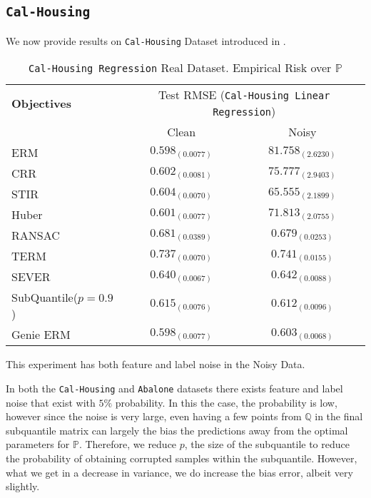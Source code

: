 \documentclass{article} %
\newcommand{\subhead}[1]{\multicolumn{1}{c}{#1}}%
\begin{document}
\begin{appendices}
	\subsection{\texttt{Cal-Housing}}
	We now provide results on \texttt{Cal-Housing} Dataset introduced in \cite{Kelley1997}.
	\begin{table}[!h]
		\centering
		\begin{tabular}{lcc}
			\toprule 
			\textbf{Objectives}&\multicolumn{2}{c}{Test RMSE (\texttt{Cal-Housing Linear Regression})}\\                   
			\cmidrule(rl){2-3}
			&\subhead{Clean}& \subhead{Noisy}\\ 
			\midrule
			ERM  &$0.598_{(0.0077)}$&$81.758_{(2.6230)}$\\
			CRR \cite{bhatia2017}  &$\mathbf{0.602_{(0.0081)}}$&$75.777_{(2.9403)}$\\
			STIR \cite{pmlr-v89-mukhoty19a}  &$\mathbf{0.604_{(0.0070)}}$&$65.555_{(2.1899)}$\\
			Huber \cite{Huber2009} &$\mathbf{0.601_{(0.0077)}}$&$71.813_{(2.0755)}$\\
			RANSAC \cite{RANSAC1981} &$0.681_{(0.0389)}$&$0.679_{(0.0253)}$\\
			TERM \cite{li2020tilted} &$0.737_{(0.0070)}$&$0.741_{(0.0155)}$\\
			SEVER \cite{DiakonikolasKKLSS19} &$0.640_{(0.0067)}$&$0.642_{(0.0088)}$\\
			\rowcolor{LightCyan}
			SubQuantile($p = 0.9$) &$\mathbf{0.615_{(0.0076)}}$&$\mathbf{0.612_{(0.0096)}}$\\
			\midrule 
			Genie ERM &$0.598_{(0.0077)}$&$0.603_{(0.0068)}$\\
			\bottomrule
		\end{tabular}
		\caption{\texttt{Cal-Housing Regression} Real Dataset. Empirical Risk over $\mathbb{P}$}
		\label{tab:Cal-Housing-regression}
	\end{table}
	This experiment has both feature and label noise in the Noisy Data.
	
	
	
	In both the \texttt{Cal-Housing} and \texttt{Abalone} datasets there exists feature and label noise that exist with $5\%$ probability. In this the case, the probability is low, however since the noise is very large, even having a few points from $\mathbb{Q}$ in the final subquantile matrix can largely the bias the predictions away from the optimal parameters for $\mathbb{P}$. Therefore, we reduce $p$, the size of the subquantile to reduce the probability of obtaining corrupted samples within the subquantile. However, what we get in a decrease in variance, we do increase the bias error, albeit very slightly. 
	

\end{appendices}
\end{document}
